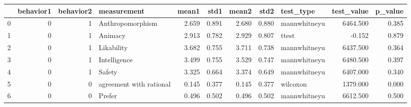 \begin{tabular}{lrrlrrrrlrr}
\toprule
{} &  behavior1 &  behavior2 &              measurement &  mean1 &   std1 &  mean2 &   std2 &     test\_type &  test\_value &  p\_value \\
\midrule
0 &          0 &          1 &         Anthropomorphism &  2.659 &  0.891 &  2.680 &  0.880 &  mannwhitneyu &    6464.500 &    0.385 \\
1 &          0 &          1 &                  Animacy &  2.913 &  0.782 &  2.929 &  0.807 &         ttest &      -0.152 &    0.879 \\
2 &          0 &          1 &               Likability &  3.682 &  0.755 &  3.711 &  0.738 &  mannwhitneyu &    6437.500 &    0.364 \\
3 &          0 &          1 &             Intelligence &  3.499 &  0.755 &  3.529 &  0.747 &  mannwhitneyu &    6480.500 &    0.397 \\
4 &          0 &          1 &                   Safety &  3.325 &  0.664 &  3.374 &  0.649 &  mannwhitneyu &    6407.000 &    0.340 \\
5 &          0 &          0 &  agreement with rational &  0.145 &  0.377 &  0.145 &  0.377 &      wilcoxon &    1379.000 &    0.000 \\
6 &          0 &          0 &                   Prefer &  0.496 &  0.502 &  0.496 &  0.502 &  mannwhitneyu &    6612.500 &    0.500 \\
\bottomrule
\end{tabular}
